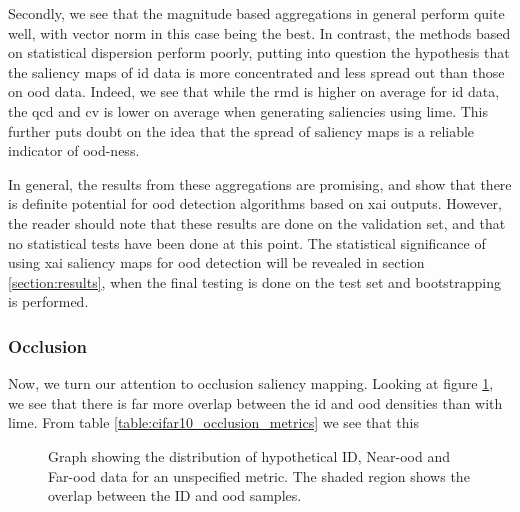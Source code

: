\documentclass[UKenglish]{uiomasterthesis} %
\theoremstyle{definition}
\begin{document}
Secondly, we see that the magnitude based aggregations in general perform quite well, with vector norm in this case being the best. In contrast, the methods based on statistical dispersion perform poorly, putting into question the hypothesis that the saliency maps of \ac{id} data is more concentrated and less spread out than those on \ac{ood} data. Indeed, we see that while the \ac{rmd} is higher on average for \ac{id} data, the \ac{qcd} and \ac{cv} is lower on average when generating saliencies using \ac{lime}. This further puts doubt on the idea that the spread of saliency maps is a reliable indicator of \ac{ood}-ness.

In general, the results from these aggregations are promising, and show that there is definite potential for \ac{ood} detection algorithms based on \ac{xai} outputs. However, the reader should note that these results are done on the validation set, and that no statistical tests have been done at this point. The statistical significance of using \ac{xai} saliency maps for \ac{ood} detection will be revealed in section \ref{section:results}, when the final testing is done on the test set and bootstrapping is performed.

\subsubsection{Occlusion}

Now, we turn our attention to occlusion saliency mapping. Looking at figure \ref{fig:imagenet200_occlusion_mean_rmd}, we see that there is far more overlap between the \ac{id} and \ac{ood} densities than with \ac{lime}. From table \ref{table:cifar10_occlusion_metrics} we see that this 

\begin{figure}
    \begin{center}
        
    \end{center}
    \caption[Hypothetical ID/\ac{ood} distributions for an \ac{ood} detection metric]{Graph showing the distribution of hypothetical ID, Near-\ac{ood} and Far-\ac{ood} data for an unspecified metric. The shaded region shows the overlap between the ID and \ac{ood} samples.}
    \label{fig:imagenet200_occlusion_mean_rmd}
\end{figure}
\end{document}

